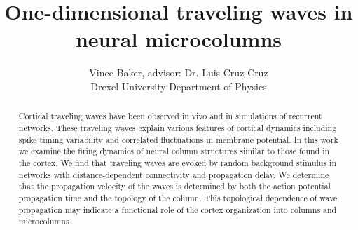 \documentclass[a4paper,11pt]{article}
\title{One-dimensional traveling waves in neural microcolumns}
\author{Vince Baker, advisor: Dr. Luis Cruz Cruz\\ Drexel University Department of Physics}
\begin{document}
\maketitle

\begin{abstract}
Cortical traveling waves have been observed in vivo and in simulations of recurrent networks.
These traveling waves explain various features of cortical dynamics including spike timing variability and correlated fluctuations in membrane potential.
In this work we examine the firing dynamics of neural column structures similar to those found in the cortex.
We find that traveling waves are evoked by random background stimulus in networks with distance-dependent connectivity and propagation delay.
We determine that the propagation velocity of the waves is determined by both the action potential propagation time and the topology of the column.
This topological dependence of wave propagation may indicate a functional role of the cortex organization into columns and microcolumns.

\end{abstract}
\end{document}
